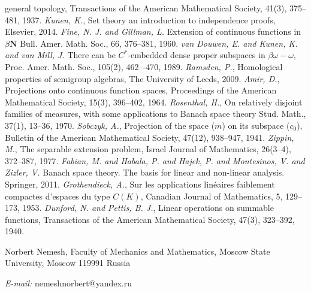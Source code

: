 \documentclass[12pt]{article}
\begin{document}
\begin{thebibliography}{999}
    general topology, Transactions of the American Mathematical Society, 41(3),
    375--481, 1937.
    \textit{Kunen, K.}, Set theory an introduction to independence proofs,
    Elsevier, 2014.
    \textit{Fine, N. J. and Gillman, L.}
    Extension of continuous functions in $\beta {\mathbf{N}}$ Bull. Amer. Math.
    Soc., 66, 376--381, 1960.
    \textit{van Douwen, E. and  Kunen,  K. and van Mill, J.}
    There can be $C^*$-embedded dense proper subspaces in $\beta\omega-\omega$,
    Proc. Amer. Math. Soc., 105(2), 462–-470, 1989.
    \textit{Ramsden, P.}, Homological properties of semigroup algebras, The
    University of Leeds, 2009.
    \textit{Amir, D.}, Projections onto continuous function spaces, Proceedings
    of the American Mathematical Society, 15(3), 396--402, 1964.
    \textit{Rosenthal, H.}, On relatively disjoint families of measures, with
    some applications to Banach space theory Stud. Math., 37(1), 13--36, 1970.
    \textit{Sobczyk, A.}, Projection of the space ($m$) on its subspace ($c_0$),
    Bulletin of the American Mathematical Society, 47(12), 938--947, 1941.
    \textit{Zippin, M.}, The separable extension problem, Israel Journal of
    Mathematics, 26(3--4), 372--387, 1977.
    \textit{Fabian, M. and Habala, P. and Hajek, P. and
        Montesinos, V. and Zizler, V.}
    Banach space theory. The basis for linear and non-linear analysis. Springer,
    2011.
    \textit{{Grothendieck, A.}}, Sur les applications lin{\'e}aires faiblement
    compactes d'espaces du type $C(K)$, Canadian Journal of Mathematics, 5,
    129--173, 1953.
    \textit{Dunford, N. and Pettis, B. J.}, Linear operations on summable
    functions, Transactions of the American Mathematical Society, 47(3),
    323--392, 1940.
\end{thebibliography}

Norbert Nemesh, Faculty of Mechanics and Mathematics, Moscow State University,
Moscow 119991 Russia

\textit{E-mail:} nemeshnorbert@yandex.ru
\end{document}
